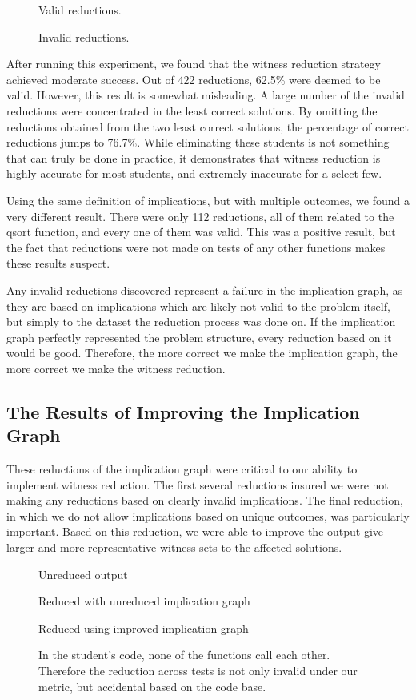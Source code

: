 \documentclass[11pt,twoside]{article}
\begin{document}
\begin{figure}

\caption{Valid reductions.}

\caption{Invalid reductions.}
\end{figure}


After running this experiment, we found that the witness reduction strategy achieved moderate success. Out of 422 reductions, 62.5\% were deemed to be valid. However, this result is somewhat misleading. A large number of the invalid reductions were concentrated in the least correct solutions. By omitting the reductions obtained from the two least correct solutions, the percentage of correct reductions jumps to 76.7\%. While eliminating these students is not something that can truly be done in practice, it demonstrates that witness reduction is highly accurate for most students, and extremely inaccurate for a select few.

Using the same definition of implications, but with multiple outcomes, we found a very different result. There were only 112 reductions, all of them related to the qsort function, and every one of them was valid. This was a positive result, but the fact that reductions were not made on tests of any other functions makes these results suspect.

Any invalid reductions discovered represent a failure in the implication graph, as they are based on implications which are likely not valid to the problem itself, but simply to the dataset the reduction process was done on. If the implication graph perfectly represented the problem structure, every reduction based on it would be good. Therefore, the more correct we make the implication graph, the more correct we make the witness reduction.


\subsection{The Results  of Improving the Implication Graph}

These reductions of the implication graph were critical to our ability to implement witness reduction. The first several reductions insured we were not making any reductions based on clearly invalid implications. The final reduction, in which we do not allow implications based on unique outcomes, was particularly important. Based on this reduction, we were able to improve the output give larger and more representative witness sets to the affected solutions.

\begin{figure}

\caption{Unreduced output}

\caption{Reduced with unreduced implication graph}

\caption{Reduced using improved implication graph}
\caption{In the student's code, none of the functions call each other. Therefore the reduction across tests is not only invalid under our metric, but accidental based on the code base.}
\end{figure}
\end{document}
